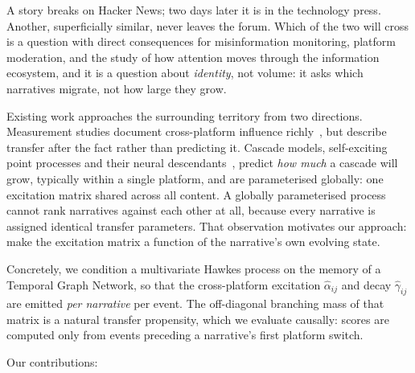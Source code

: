 \documentclass[11pt]{article}
\begin{document}
A story breaks on Hacker News; two days later it is in the technology press.
Another, superficially similar, never leaves the forum. Which of the two will
cross is a question with direct consequences for misinformation monitoring,
platform moderation, and the study of how attention moves through the
information ecosystem, and it is a question about \emph{identity}, not
volume: it asks which narratives migrate, not how large they grow.

Existing work approaches the surrounding territory from two directions.
Measurement studies document cross-platform influence
richly~\citep{zannettou2017webcentipede,wilson2020crossplatform,vosoughi2018spread},
but describe transfer after the fact rather than predicting it. Cascade
models, self-exciting point processes and their neural
descendants~\citep{zhao2015seismic,mei2017neural,cao2017deephawkes}, predict
\emph{how much} a cascade will grow, typically within a single platform, and
are parameterised globally: one excitation matrix shared across all content.
A globally parameterised process cannot rank narratives against each other at
all, because every narrative is assigned identical transfer parameters. That
observation motivates our approach: make the excitation matrix a function of
the narrative's own evolving state.

Concretely, we condition a multivariate Hawkes process on the memory of a
Temporal Graph Network, so that the cross-platform excitation
$\hat\alpha_{ij}$ and decay $\hat\gamma_{ij}$ are emitted \emph{per narrative}
per event. The off-diagonal branching mass of that matrix is a natural
transfer propensity, which we evaluate causally: scores are computed only from
events preceding a narrative's first platform switch.

Our contributions:
\end{document}
